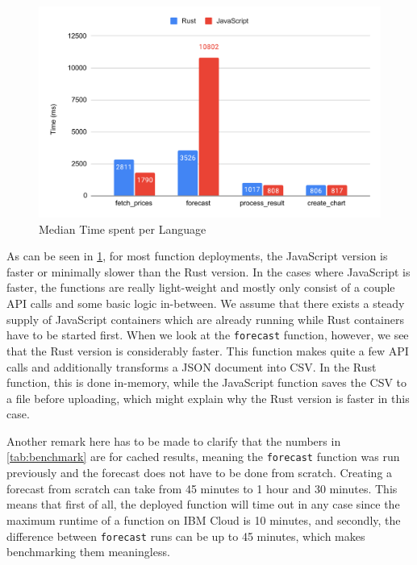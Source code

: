 \begin{figure}[h]
  \centering
  \includegraphics[width=\textwidth, keepaspectratio]{./assets/evaluation-language}
  \caption{Median Time spent per Language}
  \label{fig:time_per_language}
\end{figure}

As can be seen in \cref{fig:time_per_language}, for most function deployments,
the JavaScript version is faster or minimally slower than the Rust version.
In the cases where JavaScript is faster, the functions are really light-weight and
mostly only consist of a couple API calls and some basic logic in-between. We assume
that there exists a steady supply of JavaScript containers which are already
running while Rust containers have to be started first. When we look at the \texttt{forecast}
function, however, we see that the Rust version is considerably faster. This function
makes quite a few API calls and additionally transforms a JSON document into CSV. In
the Rust function, this is done in-memory, while the JavaScript function
saves the CSV to a file before uploading, which might explain why the Rust version
is faster in this case.

Another remark here has to be made to clarify that the numbers in \cref{tab:benchmark}
are for cached results, meaning the \texttt{forecast} function was run previously
and the forecast does not have to be done from scratch. Creating a forecast from
scratch can take from 45 minutes to 1 hour and 30 minutes. This means that first of all,
the deployed function will time out in any case since the maximum runtime of a function
on IBM Cloud is 10 minutes, and secondly, the difference between \texttt{forecast} runs can be up
to 45 minutes, which makes benchmarking them meaningless.

